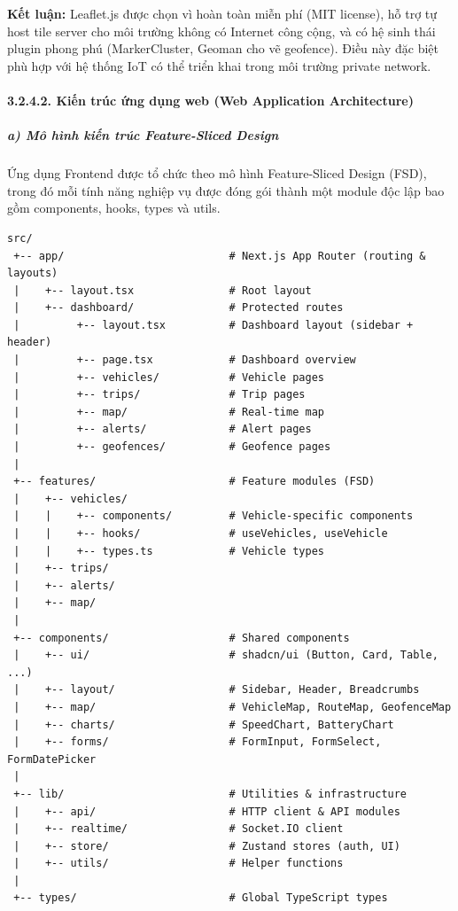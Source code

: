 \documentclass[13pt,a4paper]{extarticle}
\renewcommand{\\}{\thesislongtableorignewline\hline}%
\begin{document}
\textbf{Kết luận:} Leaflet.js được chọn vì hoàn toàn miễn phí (MIT
license), hỗ trợ tự host tile server cho môi trường không có Internet
công cộng, và có hệ sinh thái plugin phong phú (MarkerCluster, Geoman
cho vẽ geofence). Điều này đặc biệt phù hợp với hệ thống IoT có thể
triển khai trong môi trường private network.

\paragraph{3.2.4.2. Kiến trúc ứng dụng web (Web Application
Architecture)}\label{3242-kiux1ebfn-truxfac-ux1ee9ng-dux1ee5ng-web-web-application-architecture}

\subparagraph{a) Mô hình kiến trúc Feature-Sliced
Design}\label{a-muxf4-huxecnh-kiux1ebfn-truxfac-feature-sliced-design}

Ứng dụng Frontend được tổ chức theo mô hình Feature-Sliced Design (FSD),
trong đó mỗi tính năng nghiệp vụ được đóng gói thành một module độc lập
bao gồm components, hooks, types và utils.

\begin{verbatim}
src/
 +-- app/                          # Next.js App Router (routing & layouts)
 |    +-- layout.tsx               # Root layout
 |    +-- dashboard/               # Protected routes
 |         +-- layout.tsx          # Dashboard layout (sidebar + header)
 |         +-- page.tsx            # Dashboard overview
 |         +-- vehicles/           # Vehicle pages
 |         +-- trips/              # Trip pages
 |         +-- map/                # Real-time map
 |         +-- alerts/             # Alert pages
 |         +-- geofences/          # Geofence pages
 |
 +-- features/                     # Feature modules (FSD)
 |    +-- vehicles/
 |    |    +-- components/         # Vehicle-specific components
 |    |    +-- hooks/              # useVehicles, useVehicle
 |    |    +-- types.ts            # Vehicle types
 |    +-- trips/
 |    +-- alerts/
 |    +-- map/
 |
 +-- components/                   # Shared components
 |    +-- ui/                      # shadcn/ui (Button, Card, Table, ...)
 |    +-- layout/                  # Sidebar, Header, Breadcrumbs
 |    +-- map/                     # VehicleMap, RouteMap, GeofenceMap
 |    +-- charts/                  # SpeedChart, BatteryChart
 |    +-- forms/                   # FormInput, FormSelect, FormDatePicker
 |
 +-- lib/                          # Utilities & infrastructure
 |    +-- api/                     # HTTP client & API modules
 |    +-- realtime/                # Socket.IO client
 |    +-- store/                   # Zustand stores (auth, UI)
 |    +-- utils/                   # Helper functions
 |
 +-- types/                        # Global TypeScript types
\end{verbatim}
\end{document}
